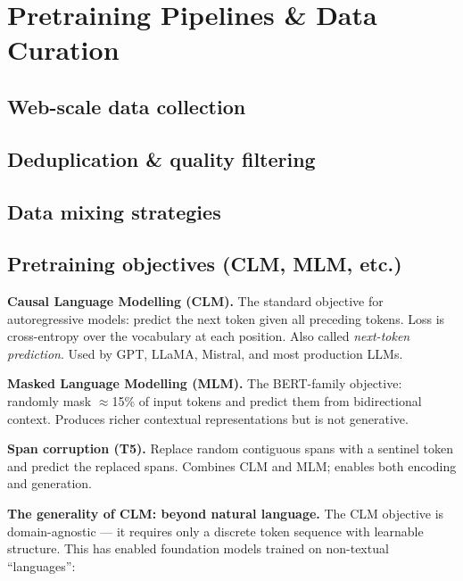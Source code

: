 
\section{Pretraining Pipelines \& Data Curation}

\subsection{Web-scale data collection}


\subsection{Deduplication \& quality filtering}


\subsection{Data mixing strategies}


\subsection{Pretraining objectives (CLM, MLM, etc.)}

\textbf{Causal Language Modelling (CLM).} The standard objective for autoregressive
models: predict the next token given all preceding tokens. Loss is cross-entropy over
the vocabulary at each position. Also called \emph{next-token prediction}. Used by
GPT, LLaMA, Mistral, and most production LLMs.

\textbf{Masked Language Modelling (MLM).} The BERT-family objective: randomly mask
$\approx$15\% of input tokens and predict them from bidirectional context. Produces
richer contextual representations but is not generative.

\textbf{Span corruption (T5).} Replace random contiguous spans with a sentinel token
and predict the replaced spans. Combines CLM and MLM; enables both encoding and
generation.

\textbf{The generality of CLM: beyond natural language.} The CLM objective is
domain-agnostic --- it requires only a discrete token sequence with learnable
structure. This has enabled foundation models trained on non-textual ``languages'':

